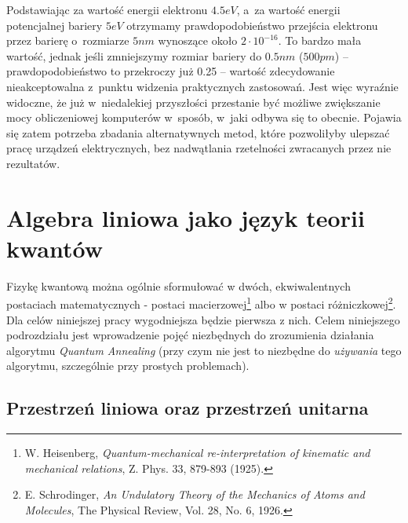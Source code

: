 \documentclass[12pt,a4paper,twoside,openany]{book}
\begin{document}
Podstawiając za wartość energii elektronu $4.5 eV$, a~za wartość energii potencjalnej bariery $5 eV$ otrzymamy prawdopodobieństwo przejścia elektronu przez barierę o~rozmiarze $5 nm$ wynoszące około $ 2 \cdot 10^{-16} $. 
To bardzo mała wartość, jednak jeśli zmniejszymy rozmiar bariery do $0.5 nm$ ($500 pm$) – prawdopodobieństwo to przekroczy już 0.25 – wartość zdecydowanie nieakceptowalna z~punktu widzenia praktycznych zastosowań. 
Jest więc wyraźnie widoczne, że już w~niedalekiej przyszłości przestanie być możliwe zwiększanie mocy obliczeniowej komputerów w~sposób, w~jaki odbywa się to obecnie. 
Pojawia się zatem potrzeba zbadania alternatywnych metod, które pozwoliłyby ulepszać pracę urządzeń elektrycznych, bez nadwątlania rzetelności zwracanych przez nie rezultatów.

\section{Algebra liniowa jako język teorii kwantów}

Fizykę kwantową można ogólnie sformułować w dwóch, ekwiwalentnych postaciach matematycznych - postaci macierzowej\footnote{W. Heisenberg, \textit{Quantum-mechanical re-interpretation of kinematic and mechanical relations}, Z. Phys. 33, 879-893 (1925).} albo w postaci różniczkowej\footnote{E.  Schrodinger, \textit{An Undulatory Theory of the Mechanics of Atoms and Molecules}, The Physical Review, Vol. 28, No. 6, 1926.}. Dla celów niniejszej pracy wygodniejsza będzie pierwsza z nich. Celem niniejszego podrozdziału jest wprowadzenie pojęć niezbędnych do zrozumienia działania algorytmu \textit{Quantum Annealing} (przy czym nie jest to niezbędne do \textit{używania} tego algorytmu, szczególnie przy prostych problemach). 

\subsection{Przestrzeń liniowa oraz przestrzeń unitarna}
\end{document}
